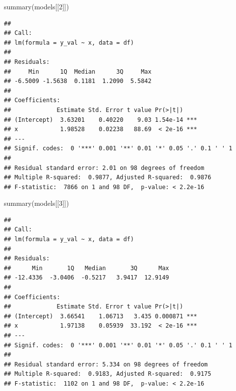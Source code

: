 \documentclass[
]{book}
\newenvironment{Shaded}{\begin{snugshade}}{\end{snugshade}}
\newcommand{\AttributeTok}[1]{\textcolor[rgb]{0.77,0.63,0.00}{#1}}
\newcommand{\ControlFlowTok}[1]{\textcolor[rgb]{0.13,0.29,0.53}{\textbf{#1}}}
\newcommand{\DecValTok}[1]{\textcolor[rgb]{0.00,0.00,0.81}{#1}}
\newcommand{\FunctionTok}[1]{\textcolor[rgb]{0.00,0.00,0.00}{#1}}
\newcommand{\NormalTok}[1]{#1}
\newcommand{\OtherTok}[1]{\textcolor[rgb]{0.56,0.35,0.01}{#1}}
\newcommand{\SpecialCharTok}[1]{\textcolor[rgb]{0.00,0.00,0.00}{#1}}
\begin{document}
\begin{Shaded}
\end{Shaded}

\begin{Shaded}
\begin{Highlighting}[]
\FunctionTok{summary}\NormalTok{(models[[}\DecValTok{2}\NormalTok{]])}
\end{Highlighting}
\end{Shaded}

\begin{verbatim}
## 
## Call:
## lm(formula = y_val ~ x, data = df)
## 
## Residuals:
##     Min      1Q  Median      3Q     Max 
## -6.5009 -1.5638  0.1181  1.2090  5.5842 
## 
## Coefficients:
##             Estimate Std. Error t value Pr(>|t|)    
## (Intercept)  3.63201    0.40220    9.03 1.54e-14 ***
## x            1.98528    0.02238   88.69  < 2e-16 ***
## ---
## Signif. codes:  0 '***' 0.001 '**' 0.01 '*' 0.05 '.' 0.1 ' ' 1
## 
## Residual standard error: 2.01 on 98 degrees of freedom
## Multiple R-squared:  0.9877, Adjusted R-squared:  0.9876 
## F-statistic:  7866 on 1 and 98 DF,  p-value: < 2.2e-16
\end{verbatim}

\begin{Shaded}
\begin{Highlighting}[]
\FunctionTok{summary}\NormalTok{(models[[}\DecValTok{3}\NormalTok{]])}
\end{Highlighting}
\end{Shaded}

\begin{verbatim}
## 
## Call:
## lm(formula = y_val ~ x, data = df)
## 
## Residuals:
##      Min       1Q   Median       3Q      Max 
## -12.4336  -3.0406  -0.5217   3.9417  12.9149 
## 
## Coefficients:
##             Estimate Std. Error t value Pr(>|t|)    
## (Intercept)  3.66541    1.06713   3.435 0.000871 ***
## x            1.97138    0.05939  33.192  < 2e-16 ***
## ---
## Signif. codes:  0 '***' 0.001 '**' 0.01 '*' 0.05 '.' 0.1 ' ' 1
## 
## Residual standard error: 5.334 on 98 degrees of freedom
## Multiple R-squared:  0.9183, Adjusted R-squared:  0.9175 
## F-statistic:  1102 on 1 and 98 DF,  p-value: < 2.2e-16
\end{verbatim}
\end{document}
